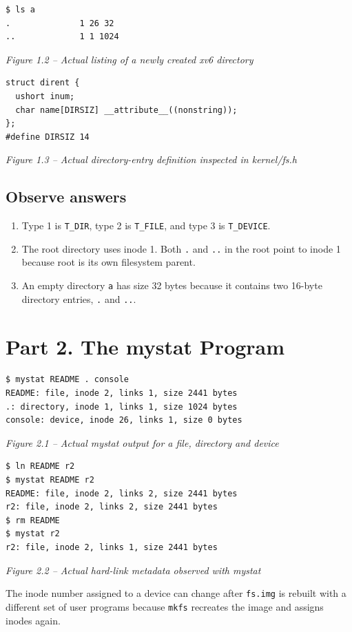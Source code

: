 \documentclass[12pt,a4paper]{article}
\newcommand{\figcap}[1]{\begin{center}\small\textit{#1}\end{center}\vspace{0.4em}}
\begin{document}
\begin{lstlisting}
$ ls a
.              1 26 32
..             1 1 1024
\end{lstlisting}
\figcap{Figure 1.2 -- Actual listing of a newly created xv6 directory}

\begin{lstlisting}
struct dirent {
  ushort inum;
  char name[DIRSIZ] __attribute__((nonstring));
};
#define DIRSIZ 14
\end{lstlisting}
\figcap{Figure 1.3 -- Actual directory-entry definition inspected in kernel/fs.h}

\subsection{Observe answers}
\begin{enumerate}[label=\arabic*.]
\item Type 1 is \texttt{T\_DIR}, type 2 is \texttt{T\_FILE}, and type 3 is \texttt{T\_DEVICE}.
\item The root directory uses inode 1. Both \texttt{.} and \texttt{..} in the root point to inode 1 because root is its own filesystem parent.
\item An empty directory \texttt{a} has size 32 bytes because it contains two 16-byte directory entries, \texttt{.} and \texttt{..}.
\end{enumerate}

\section{Part 2. The mystat Program}
\begin{lstlisting}
$ mystat README . console
README: file, inode 2, links 1, size 2441 bytes
.: directory, inode 1, links 1, size 1024 bytes
console: device, inode 26, links 1, size 0 bytes
\end{lstlisting}
\figcap{Figure 2.1 -- Actual mystat output for a file, directory and device}

\begin{lstlisting}
$ ln README r2
$ mystat README r2
README: file, inode 2, links 2, size 2441 bytes
r2: file, inode 2, links 2, size 2441 bytes
$ rm README
$ mystat r2
r2: file, inode 2, links 1, size 2441 bytes
\end{lstlisting}
\figcap{Figure 2.2 -- Actual hard-link metadata observed with mystat}

The inode number assigned to a device can change after \texttt{fs.img} is rebuilt with a different set of user programs because \texttt{mkfs} recreates the image and assigns inodes again.
\end{document}
